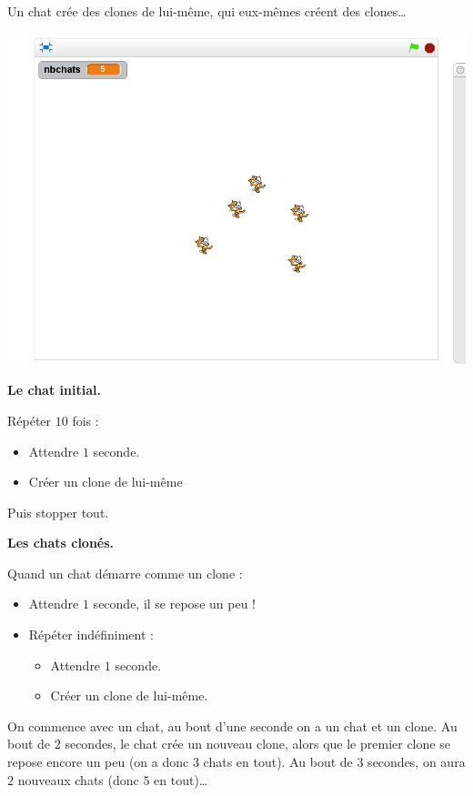 \documentclass[class=report,crop=false, 12pt]{standalone}
\begin{document}
\begin{enigme}

Un chat crée des clones de lui-même, qui eux-mêmes créent des clones\ldots
\begin{center}
  \includegraphics[scale=\scaleecran]{ecran-08-eg2} 
\end{center}

\textbf{Le chat initial.}

Répéter $10$ fois :
\begin{itemize}
  \item Attendre $1$ seconde.
  \item Créer un clone de lui-même
\end{itemize}
Puis stopper tout.


\bigskip

\textbf{Les chats clonés.}

Quand un chat démarre comme un clone :
\begin{itemize}
  \item Attendre $1$ seconde, il se repose un peu !
  \item Répéter indéfiniment :
  \begin{itemize}
    \item Attendre $1$ seconde.
    \item Créer un clone de lui-même.
  \end{itemize}
\end{itemize}
  
\bigskip

On commence avec un chat, au bout d'une seconde
on a un chat et un clone. Au bout de $2$ secondes, le chat crée un nouveau clone, alors que le premier clone se repose encore un peu (on a donc $3$ chats en tout).
Au bout de $3$ secondes, on aura $2$ nouveaux chats (donc $5$ en tout)\ldots


\end{enigme}
\end{document}
